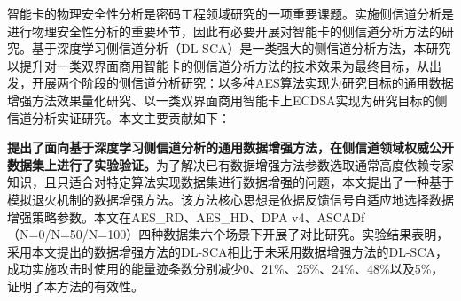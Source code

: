 智能卡的物理安全性分析是密码工程领域研究的一项重要课题。实施侧信道分析是进行物理安全性分析的重要环节，因此有必要开展对智能卡的侧信道分析方法的研究。基于深度学习侧信道分析（DL-SCA）是一类强大的侧信道分析方法，本研究以提升对一类双界面商用智能卡的侧信道分析方法的技术效果为最终目标，从\jiaodu 出发，开展两个阶段的侧信道分析研究：以多种AES算法实现为研究目标的通用数据增强方法效果量化研究、以一类双界面商用智能卡上ECDSA实现为研究目标的侧信道分析实证研究。本文主要贡献如下：

\textbf{提出了面向基于深度学习侧信道分析的通用数据增强方法，在侧信道领域权威公开数据集上进行了实验验证。}为了解决已有数据增强方法参数选取通常高度依赖专家知识，且只适合对特定算法实现数据集进行数据增强的问题，本文提出了一种基于模拟退火机制的数据增强方法。该方法核心思想是依据反馈信号自适应地选择数据增强策略参数。本文在AES\_RD、AES\_HD、DPA v4、ASCADf（N=0/N=50/N=100）四种数据集六个场景下开展了对比研究。实验结果表明，采用本文提出的数据增强方法的DL-SCA相比于未采用数据增强方法的DL-SCA，成功实施攻击时使用的能量迹条数分别减少0、21\%、25\%、24\%、48\%以及5\%，证明了本方法的有效性。



